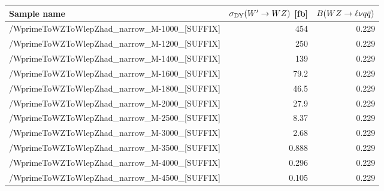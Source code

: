 \scriptsize
\begin{tabular}{lrr}
  \hline
  \textbf{Sample name} & $\sigma_{\mathrm{DY}}(W'\to WZ)$ [fb] & $B(WZ\to\ell\nu q\bar{q})$ \\
  \hline
  \ttfamily /WprimeToWZToWlepZhad\_narrow\_M-1000\_[SUFFIX] & 454 & 0.229  \\
  \ttfamily /WprimeToWZToWlepZhad\_narrow\_M-1200\_[SUFFIX] & 250 & 0.229  \\
  \ttfamily /WprimeToWZToWlepZhad\_narrow\_M-1400\_[SUFFIX] & 139 & 0.229  \\
  \ttfamily /WprimeToWZToWlepZhad\_narrow\_M-1600\_[SUFFIX] & 79.2 & 0.229  \\
  \ttfamily /WprimeToWZToWlepZhad\_narrow\_M-1800\_[SUFFIX] & 46.5 & 0.229  \\
  \ttfamily /WprimeToWZToWlepZhad\_narrow\_M-2000\_[SUFFIX] & 27.9 & 0.229  \\
  \ttfamily /WprimeToWZToWlepZhad\_narrow\_M-2500\_[SUFFIX] & 8.37 & 0.229  \\
  \ttfamily /WprimeToWZToWlepZhad\_narrow\_M-3000\_[SUFFIX] & 2.68 & 0.229  \\
  \ttfamily /WprimeToWZToWlepZhad\_narrow\_M-3500\_[SUFFIX] & 0.888 & 0.229  \\
  \ttfamily /WprimeToWZToWlepZhad\_narrow\_M-4000\_[SUFFIX] & 0.296 & 0.229  \\
  \ttfamily /WprimeToWZToWlepZhad\_narrow\_M-4500\_[SUFFIX] & 0.105 & 0.229  \\
  \hline
\end{tabular}
